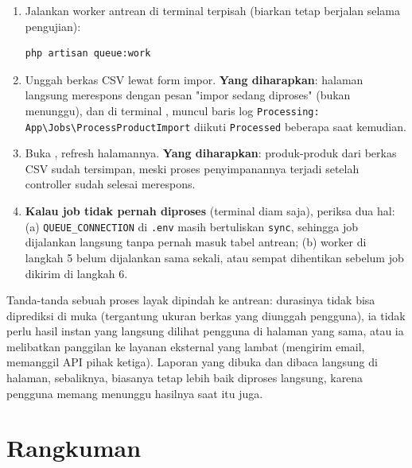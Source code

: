 \begin{enumerate}
\begin{lstlisting}[language=php, title=\lstfile{app/Http/Controllers/ReportController.php}]
return back()->with('success', 'Impor sedang diproses di latar belakang.');
    \end{lstlisting}
  \item Jalankan worker antrean di terminal terpisah (biarkan tetap
    berjalan selama pengujian):
    \begin{lstlisting}[language=bash]
php artisan queue:work
    \end{lstlisting}
  \item Unggah berkas CSV lewat form impor. \textbf{Yang diharapkan}:
    halaman langsung merespons dengan pesan "impor sedang diproses"
    (bukan menunggu), dan di terminal , muncul baris log
    \texttt{Processing: App\textbackslash{}Jobs\textbackslash{}ProcessProductImport}
    diikuti \texttt{Processed} beberapa saat kemudian.
  \item Buka , refresh halamannya. \textbf{Yang
    diharapkan}: produk-produk dari berkas CSV sudah tersimpan, meski
    proses penyimpanannya terjadi setelah controller sudah selesai
    merespons.
  \item \textbf{Kalau job tidak pernah diproses} (terminal
     diam saja), periksa dua hal: (a)
    \texttt{QUEUE\_CONNECTION} di \texttt{.env} masih bertuliskan
    \texttt{sync}, sehingga job dijalankan langsung tanpa pernah masuk
    tabel antrean; (b) worker di langkah 5 belum dijalankan sama sekali,
    atau sempat dihentikan sebelum job dikirim di langkah 6.
\end{enumerate}

\begin{tipbox}
Tanda-tanda sebuah proses layak dipindah ke antrean: durasinya tidak
bisa diprediksi di muka (tergantung ukuran berkas yang diunggah
pengguna), ia tidak perlu hasil instan yang langsung dilihat pengguna
di halaman yang sama, atau ia melibatkan panggilan ke layanan eksternal
yang lambat (mengirim email, memanggil API pihak ketiga). Laporan yang
dibuka dan dibaca langsung di halaman, sebaliknya, biasanya tetap lebih
baik diproses langsung, karena pengguna memang menunggu hasilnya saat
itu juga.
\end{tipbox}


\section{Rangkuman}
\label{sec:pengolahan-data-rangkuman}


